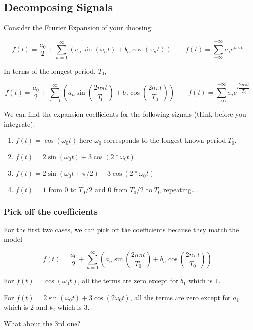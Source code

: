 \subsection{Decomposing Signals}\label{decomposing-signals}

Consider the Fourier Expansion of your choosing:

\[f(t) = \dfrac{a_0}{2} + \sum_{n=1}^{\infty} \left(a_n \sin(\omega_n t) + b_n \cos(\omega_n t) \right) \qquad f(t) = \sum_{-\infty}^{+\infty} c_n e^{i\omega_n t}\]

In terms of the longest period, \(T_0\),

\[f(t) = \dfrac{a_0}{2} + \sum_{n=1}^{\infty} \left(a_n \sin(\dfrac{2n\pi t}{T_0}) + b_n \cos(\dfrac{2n\pi t}{T_0}) \right) \qquad f(t) = \sum_{-\infty}^{+\infty} c_n e^{i\dfrac{2n\pi t}{T_0}}\]

We can find the expansion coefficients for the following signals (think
before you integrate):

\begin{enumerate}
\def\labelenumi{\arabic{enumi}.}
\tightlist
\item
  \(f(t) = \cos(\omega_0 t)\) here \(\omega_0\) corresponds to the
  longest known period \(T_0\).
\item
  \(f(t) = 2\sin(\omega_0 t) + 3\cos(2*\omega_0t)\)
\item
  \(f(t) = 2\sin(\omega_0 t+\pi/2) + 3\cos(2*\omega_0t)\)
\item
  \(f(t) = 1\) from 0 to \(T_0/2\) and 0 from \(T_0/2\) to \(T_0\)
  repeating\ldots.
\end{enumerate}

\subsubsection{Pick off the
coefficients}\label{pick-off-the-coefficients}

For the first two cases, we can pick off the coefficients because they
match the model

\[f(t) = \dfrac{a_0}{2} + \sum_{n=1}^{\infty} \left(a_n \sin(\dfrac{2n\pi t}{T_0}) + b_n \cos(\dfrac{2n\pi t}{T_0}) \right)\]

For \(f(t) = \cos(\omega_0 t)\), all the terms are zero except for
\(b_1\) which is 1.

For \(f(t) = 2 \sin(\omega_0 t) + 3 \cos(2\omega_0 t)\), all the terms
are zero except for \(a_1\) which is 2 and \(b_2\) which is 3.

What about the 3rd one?

